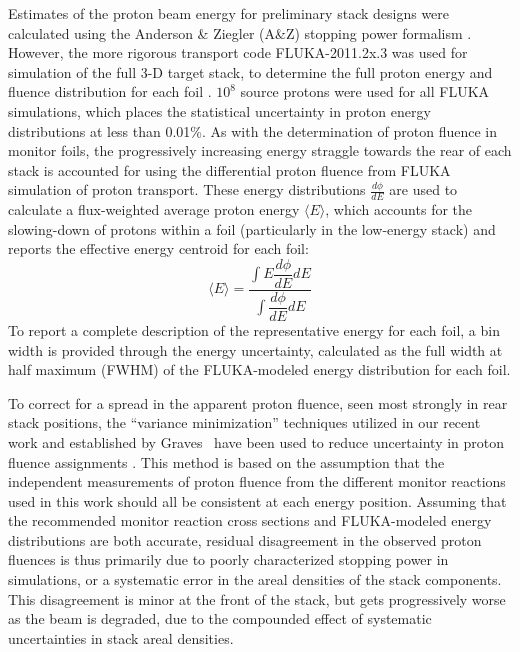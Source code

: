 Estimates of the proton beam energy for preliminary stack designs were calculated using the Anderson \& Ziegler (A\&Z) stopping power formalism \cite{Andersen_Ziegler_1977,Ziegler1985,Ziegler1999}.
However, the more rigorous  transport code FLUKA-2011.2x.3 was used for simulation of the full 3-D target stack, to determine the full proton energy and fluence distribution for each foil   \cite{Bohlen2014a}. 
$10^8$ source protons were used for all FLUKA simulations, which places the statistical uncertainty in proton energy distributions at less than 0.01\%.
As with the determination of proton fluence in monitor foils, the progressively increasing energy straggle towards the rear of each stack is accounted for using the differential proton fluence from FLUKA simulation of proton transport.
These energy distributions $\frac{d\phi}{dE}$ are used to calculate a flux-weighted average proton  energy $\langle E \rangle$, which accounts for the slowing-down of protons within a foil (particularly in the low-energy stack) and reports the effective  energy centroid for each foil:
\begin{equation}
\langle E \rangle = \dfrac{{\displaystyle\int E \dfrac{d\phi}{dE} dE}}{{\displaystyle\int \dfrac{d\phi}{dE} dE}}
\end{equation}
To report a complete description of the representative energy for each foil, a bin width is provided through the  energy uncertainty, calculated as the full width at half maximum (FWHM) of the FLUKA-modeled energy distribution for each foil.


To correct for a spread in the apparent proton fluence, seen most strongly in rear stack positions, the \enquote{variance minimization} techniques utilized in our recent work and established by Graves \etal\ have been used to reduce uncertainty in proton fluence assignments \cite{Voyles2018a,Graves2016}.
This method is based on the assumption that the independent measurements of proton fluence from the different monitor reactions used in this work should all be consistent at each energy position.
Assuming that the recommended monitor reaction cross sections and FLUKA-modeled energy distributions are both accurate, residual disagreement in the  observed proton fluences is thus primarily due to poorly characterized stopping power in simulations, or a systematic error in the 
areal densities of the stack components. 
This disagreement is minor at the front of the stack, but gets progressively worse as the beam is degraded, due to the compounded effect of systematic uncertainties in stack areal densities.



